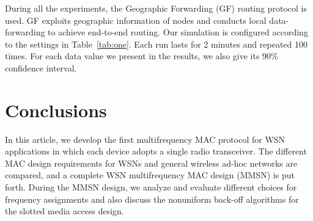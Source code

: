 \documentclass[prodmode,acmtecs]{acmsmall}
\begin{document}
During all the experiments, the Geographic Forwarding (GF)
\cite{Akyildiz-01} routing protocol is used. GF exploits geographic
information of nodes and conducts local data-forwarding to achieve
end-to-end routing. Our simulation is
configured according to the settings in
Table~\ref{tab:one}. Each run lasts for 2 minutes and
repeated 100 times. For each data value we present in the results,
we also give its 90\% confidence interval.
\begin{table}%
\begin{tabnote}%
\vskip2pt
\end{tabnote}%
\end{table}%

\section{Conclusions}

In this article, we develop the first multifrequency MAC protocol for
WSN applications in which each device adopts a
single radio transceiver. The different MAC design requirements for
WSNs and general wireless ad-hoc networks are
compared, and a complete WSN multifrequency MAC design (MMSN) is
put forth. During the MMSN design, we analyze and evaluate different
choices for frequency assignments and also discuss the nonuniform
back-off algorithms for the slotted media access design.
\end{document}
